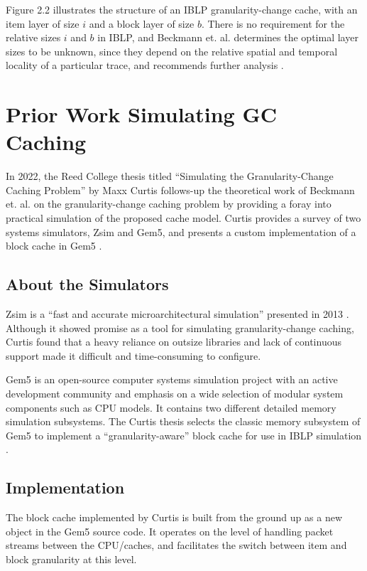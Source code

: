 \documentclass[12pt,twoside]{reedthesis}
\begin{document}
	Figure 2.2 illustrates the structure of an IBLP granularity-change cache, with an item layer of size $i$ and a block layer of size $b$. There is no requirement for the relative sizes $i$ and $b$ in IBLP, and Beckmann et. al. determines the optimal layer sizes to be unknown, since they depend on the relative spatial and temporal locality of a particular trace, and recommends further analysis \cite{beckmann}.

\section{Prior Work Simulating GC Caching}

In 2022, the Reed College thesis titled ``Simulating the Granularity-Change Caching Problem'' by Maxx Curtis follows-up the theoretical work of Beckmann et. al. on the granularity-change caching problem by providing a foray into practical simulation of the proposed cache model. Curtis provides a survey of two systems simulators, Zsim and Gem5, and presents a custom implementation of a block cache in Gem5 \cite{curtis}.

	\subsection*{About the Simulators}

	Zsim is a ``fast and accurate microarchitectural simulation'' presented in 2013 \cite{zsim}. Although it showed promise as a tool for simulating granularity-change caching, Curtis found that a heavy reliance on outsize libraries and lack of continuous support made it difficult and time-consuming to configure.

	Gem5 is an open-source computer systems simulation project with an active development community and emphasis on a wide selection of modular system components such as CPU models. It contains two different detailed memory simulation subsystems. The Curtis thesis selects the classic memory subsystem of Gem5 to implement a ``granularity-aware'' block cache for use in IBLP simulation \cite{curtis}.

	\subsection*{Implementation}

	The block cache implemented by Curtis is built from the ground up as a new object in the Gem5 source code. It operates on the level of handling packet streams between the CPU/caches, and facilitates the switch between item and block granularity at this level.
\end{document}
